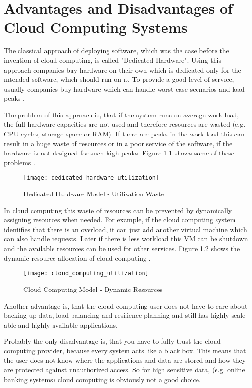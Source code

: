 \chapter{Advantages and Disadvantages of Cloud Computing Systems}
\label{chap:advantages}

The classical approach of deploying software, which was the case before the invention of cloud computing, is called "Dedicated Hardware". Using this approach companies buy hardware on their own which is dedicated only for the intended software, which should run on it. To provide a good level of service, usually companies buy hardware which can handle worst case scenarios and load peaks \cite{Gajbhiye_2014}.

The problem of this approach is, that if the system runs on average work load, the full hardware capacities are not used and therefore resources are wasted (e.g. CPU cycles, storage space or RAM). If there are peaks in the work load this can result in a huge waste of resources or in a poor service of the software, if the hardware is not designed for such high peaks. Figure \ref{fig:dedicated_hardware_utilization} shows some of these problems \cite{Gajbhiye_2014}.

\begin{figure}
	\centering
		\texttt{[image: dedicated\_hardware\_utilization]}
	\caption{Dedicated Hardware Model - Utilization Waste \cite{Gajbhiye_2014}}
	\label{fig:dedicated_hardware_utilization}
\end{figure}

In cloud computing this waste of resources can be prevented by dynamically assigning resources when needed. For example, if the cloud computing system identifies that there is an overload, it can just add another virtual machine which can also handle requests. Later if there is less workload this VM can be shutdown and the available resources can be used for other services. Figure \ref{fig:cloud_computing_utilization} shows the dynamic resource allocation of cloud computing \cite{Gajbhiye_2014}.

\begin{figure}
	\centering
		\texttt{[image: cloud\_computing\_utilization]}
	\caption{Cloud Computing Model - Dynamic Resources \cite{Gajbhiye_2014}}
	\label{fig:cloud_computing_utilization}
\end{figure}

Another advantage is, that the cloud computing user does not have to care about backing up data, load balancing and resilience planning and still has highly scale-able and highly available applications.

Probably the only disadvantage is, that you have to fully trust the cloud computing provider, because every system acts like a black box. This means that the user does not know where the applications and data are stored and how they are protected against unauthorized access. So for high sensitive data, (e.g. online banking systems) cloud computing is obviously not a good choice.